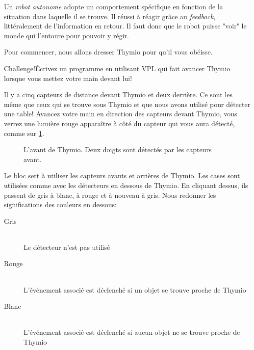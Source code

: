 \label{ch.pet}

Un \textit{robot autonome} adopte un comportement spécifique en fonction de la situation dans laquelle il se trouve. Il réussi à réagir grâce au \textit{feedback}, littéralement de l'information en retour. Il faut donc que le robot puisse "voir" le monde qui l'entoure pour pouvoir y régir.


Pour commencer, nous allons dresser Thymio pour qu'il vous obéisse. 

\begin{bclogo}[couleur = pink!30, arrondi = 0.1, logo = \bccrayon, ombre = true]{Challenge!}Écrivez un programme en utilisant VPL qui fait avancer Thymio lorsque vous mettez votre main devant lui!
\end{bclogo}

Il y a cinq capteurs de distance devant Thymio et deux derrière. Ce sont les même que ceux qui se trouve sous Thymio et que nous avons utilisé pour détecter une table! Avancez votre main en direction des capteurs devant Thymio, vous verrez une lumière rouge apparaître à côté du capteur qui vous aura détecté, comme sur \cref{fig.detect}.

\begin{figure}
\begin{center}
\caption{L'avant de Thymio. Deux doigts sont détectés par les capteurs avant.}\label{fig.detect}
\end{center}
\end{figure}

Le bloc  sert à utiliser les capteurs avants et arrières de Thymio. Les cases sont utilisées comme avec les détecteurs en dessous de Thymio. En cliquant dessus, ils passent de gris à blanc, à rouge et à nouveau à gris. Nous redonner les significations des couleurs en dessous:

\begin{description}
	\item[Gris] \hfill \\
		Le détecteur n'est pas utilisé
	\item[Rouge] \hfill \\
		L'événement associé est déclenché si un objet se trouve proche de Thymio
	\item[Blanc] \hfill \\
		L'événement associé est déclenché si aucun objet ne se trouve proche de Thymio
\end{description}

